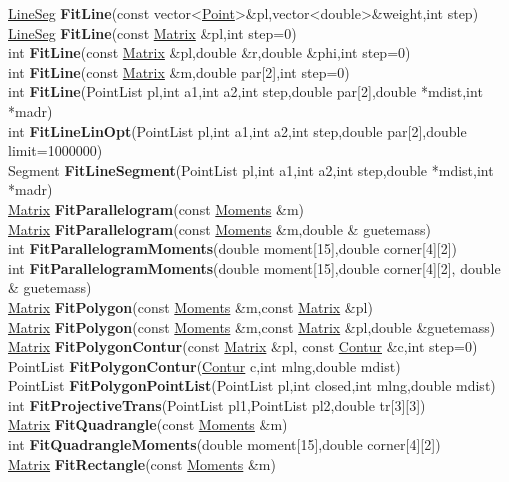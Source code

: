 \documentclass[10pt,titlepage]{article}
\def\functionlistentry#1#2#3#4#5#6{\noindent #1 {\bf #2}(#3) \dotfill #6\\}
\begin{document}
{{\functionlistentry{\hyperlink{LineSeg}{LineSeg}}{FitLine}{const vector\textless {}\hyperlink{Point}{Point}\textgreater  \&pl,vector\textless {}double\textgreater  \&weight,int step}{1162}{fitting}{}
\functionlistentry{\hyperlink{LineSeg}{LineSeg}}{FitLine}{const \hyperlink{Matrix}{Matrix} \&pl,int step=0}{1163}{fitting}{}
\functionlistentry{int}{FitLine}{const \hyperlink{Matrix}{Matrix} \&pl,double \&r,double \&phi,int step=0}{1164}{fitting}{}
\functionlistentry{int}{FitLine}{const \hyperlink{Matrix}{Matrix} \&m,double par[2],int step=0}{1165}{fitting}{}
\functionlistentry{int}{FitLine}{PointList pl,int a1,int a2,int step,double par[2],double *mdist,int *madr}{1166}{fitting}{}
\functionlistentry{int}{FitLineLinOpt}{PointList pl,int a1,int a2,int step,double par[2],double limit=1000000}{1167}{fitting}{}
\functionlistentry{Segment}{FitLineSegment}{PointList pl,int a1,int a2,int step,double *mdist,int *madr}{1181}{fitting}{}
\functionlistentry{\hyperlink{Matrix}{Matrix}}{FitParallelogram}{const \hyperlink{Moments}{Moments} \&m}{849}{moments}{}
\functionlistentry{\hyperlink{Matrix}{Matrix}}{FitParallelogram}{const \hyperlink{Moments}{Moments} \&m,double \& guetemass}{850}{moments}{}
\functionlistentry{int}{FitParallelogramMoments}{double moment[15],double corner[4][2]}{1624}{obsolet}{}
\functionlistentry{int}{FitParallelogramMoments}{double moment[15],double corner[4][2], double \& guetemass}{1625}{obsolet}{}
\functionlistentry{\hyperlink{Matrix}{Matrix}}{FitPolygon}{const \hyperlink{Moments}{Moments} \&m,const \hyperlink{Matrix}{Matrix} \&pl}{852}{moments}{}
\functionlistentry{\hyperlink{Matrix}{Matrix}}{FitPolygon}{const \hyperlink{Moments}{Moments} \&m,const \hyperlink{Matrix}{Matrix} \&pl,double \&guetemass}{853}{moments}{}
\functionlistentry{\hyperlink{Matrix}{Matrix}}{FitPolygonContur}{const \hyperlink{Matrix}{Matrix} \&pl, const \hyperlink{Contur}{Contur} \&c,int step=0}{283}{datastructures}{}
\functionlistentry{PointList}{FitPolygonContur}{\hyperlink{Contur}{Contur} c,int mlng,double mdist}{1185}{fitting}{}
\functionlistentry{PointList}{FitPolygonPointList}{PointList pl,int closed,int mlng,double mdist}{1190}{fitting}{}
\functionlistentry{int}{FitProjectiveTrans}{PointList pl1,PointList pl2,double tr[3][3]}{1590}{obsolet}{}
\functionlistentry{\hyperlink{Matrix}{Matrix}}{FitQuadrangle}{const \hyperlink{Moments}{Moments} \&m}{851}{moments}{}
\functionlistentry{int}{FitQuadrangleMoments}{double moment[15],double corner[4][2]}{1626}{obsolet}{}
\functionlistentry{\hyperlink{Matrix}{Matrix}}{FitRectangle}{const \hyperlink{Moments}{Moments} \&m}{847}{moments}{}
}}
\end{document}
